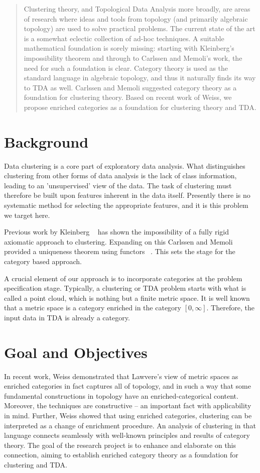 \begin{abstract}
Clustering theory, and Topological Data Analysis more broadly, are areas of research where ideas and tools from topology (and primarily algebraic topology) are used to solve practical problems. The current state of the art is a somewhat eclectic collection of ad-hoc techniques. A suitable mathematical foundation is sorely missing: starting with Kleinberg's impossibility theorem and through to Carlssen and Memoli's work, the need for such a foundation is clear. Category theory is used as the standard language in algebraic topology, and thus it naturally finds its way to TDA as well. Carlssen and Memoli suggested category theory as a foundation for clustering theory. Based on recent work of Weiss, we propose enriched categories as a foundation for clustering theory and TDA. 

\end{abstract}
\section*{Background}

Data clustering is a core part of exploratory data analysis. What distinguishes clustering from other forms of data analysis is the lack of class information, leading to an 'unsupervised' view of the data. The task of clustering must therefore be built upon features inherent in the data itself. Presently there is no systematic method for selecting the appropriate features, and it is this problem we target here.

Previous work by Kleinberg ~\cite{kleinberg2003} has shown the impossibility of a fully rigid axiomatic approach to clustering. Expanding on this Carlssen and Memoli provided a uniqueness theorem using functors ~\cite{carlsson2010classifying}. This sets the stage for the category based approach.

A crucial element of our approach is to incorporate categories at the problem specification stage. Typically, a clustering or TDA problem starts with what is called a point cloud, which is nothing but a finite metric space. It is well known ~\cite{lawvere} that a metric space is a category enriched in the category $[0,\infty ]$. Therefore, the input data in TDA is already a category. 

\section*{Goal and Objectives}
In recent work, Weiss demonstrated that Lawvere's view of metric spaces as enriched categories in fact captures all of topology, and in such a way that some fundamental constructions in topology have an enriched-categorical content. Moreover, the techniques are constructive -- an important fact with applicability in mind. Further, Weiss showed that using enriched categories, clustering can be interpreted as a change of enrichment procedure. An analysis of clustering in that language connects seamlessly with well-known principles and results of category theory. The goal of the research project is to enhance and elaborate on this connection, aiming to establish enriched category theory as a foundation for clustering and TDA. 

